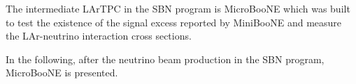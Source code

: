 \documentclass[a4paper]{article}\linespread{1.4}
\begin{document}

The intermediate LArTPC in the SBN program is MicroBooNE which was built to test the existence of the signal excess reported by MiniBooNE and measure the LAr-neutrino interaction cross sections. 

In the following, after the neutrino beam production in the SBN program, MicroBooNE is presented.
\end{document}
